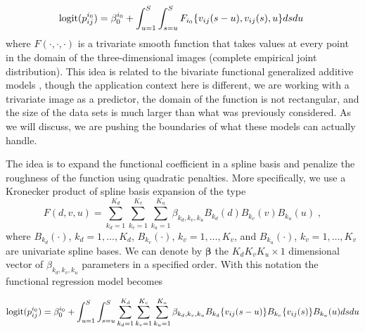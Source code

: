  
\begin{equation}
{\rm logit}(p_{ij}^{i_0}) = \beta_0^{i_0} + \int_{u=1}^{S}\int_{s=u}^S F_{i_0}\{v_{ij}(s-u), v_{ij}(s), u\}dsdu\;
\end{equation}
where $F(\cdot,\cdot,\cdot)$ is a trivariate smooth function that takes values at every point in the domain of the three-dimensional images (complete empirical joint distribution). This idea is related to the bivariate functional generalized additive models \cite{cui2021additive,mclean2014functional,mullerGAM}, though the application context here is different, we are working with a trivariate image as a predictor, the domain of the function is not rectangular, and the size of the data sets is much larger than what was previously considered. As we will discuss, we are pushing the boundaries of what these models can actually handle.

The idea is to expand the functional coefficient in a spline basis and penalize the roughness of the function using quadratic penalties. More specifically, we use a Kronecker product of spline basis expansion of the type
$$ F(d,v,u)=\sum_{k_d=1}^{K_d}\sum_{k_v=1}^{K_v}\sum_{k_u=1}^{K_u}\beta_{k_d,k_v,k_u}B_{k_d}(d)B_{k_v}(v)B_{k_u}(u)\;,$$
where $B_{k_d}(\cdot)$, $k_d=1,\ldots,K_d$, $B_{k_v}(\cdot)$, $k_v=1,\ldots,K_v$, and $B_{k_u}(\cdot)$, $k_v=1,\ldots,K_v$ are univariate spline bases. We can denote by $\boldsymbol{\beta}$ the $K_dK_vK_u\times 1$ dimensional vector of $\beta_{k_d,k_v,k_u}$ parameters in a specified order.  With this notation the functional regression model becomes

\begin{equation}{\rm{logit}} (p_{ij}^{i_0}) = \beta_0^{i_0} + \int_{u=1}^{S}\int_{s=u}^S \sum_{k_d= 1}^{K_d}\sum_{k_v=1}^{K_v}\sum_{k_u=1}^{K_u}\beta_{k_d,k_v,k_u}B_{k_d}\{v_{ij}(s-u)\}B_{k_v}\{v_{ij}(s)\}B_{k_u}(u)dsdu
\end{equation}


